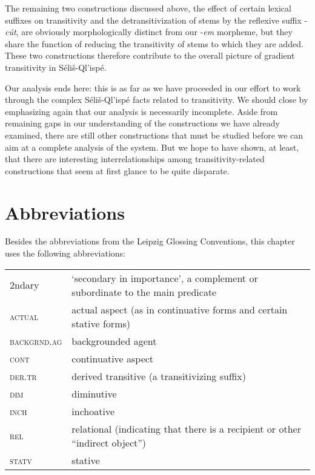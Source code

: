 \documentclass[output=paper,colorlinks,citecolor=brown]{langscibook}
\begin{document}
The remaining two constructions discussed above, the effect of certain
lexical suffixes on transitivity and the detransitivization of stems
by the reflexive suffix -\emph{c\'ut}, are obviously morphologically
distinct from our -\emph{em} morpheme, but they share the function of
reducing the transitivity of stems to which they are added.  These two
constructions therefore contribute to the overall picture of gradient
transitivity in S\'eli\v{s}-Ql'isp\'e.

Our analysis ends here: this is as far as we have proceeded in our
effort to work through the complex S\'eli\v{s}-Ql'isp\'e facts related
to transitivity.  We should close by emphasizing again that our
analysis is necessarily incomplete.  Aside from remaining gaps in our
understanding of the constructions we have already examined, there are
still other constructions that must be studied before we can aim at a
complete analysis of the system.  But we hope to have shown, at least,
that there are interesting interrelationships among
transitivity-related constructions that seem at first glance to be
quite disparate.

\section*{Abbreviations}

Besides the abbreviations from the Leipzig Glossing Conventions, this chapter uses the following
abbreviations:

\begin{tabularx}{.5\textwidth}{@{}lQ@{}}
2ndary & `secondary in importance', a complement or subordinate to
  the main predicate \\
\textsc{actual} & actual aspect (as in continuative forms and certain stative forms) \\
\textsc{backgrnd.ag} & backgrounded agent \\
\textsc{cont} & continuative aspect \\
\textsc{der.tr} & derived transitive (a transitivizing suffix) \\
\textsc{dim} & diminutive \\
\textsc{inch} & inchoative \\
\textsc{rel} & relational (indicating that there is a recipient or other ``indirect object'') \\
\textsc{statv} & stative \\
\end{tabularx}
\end{document}
